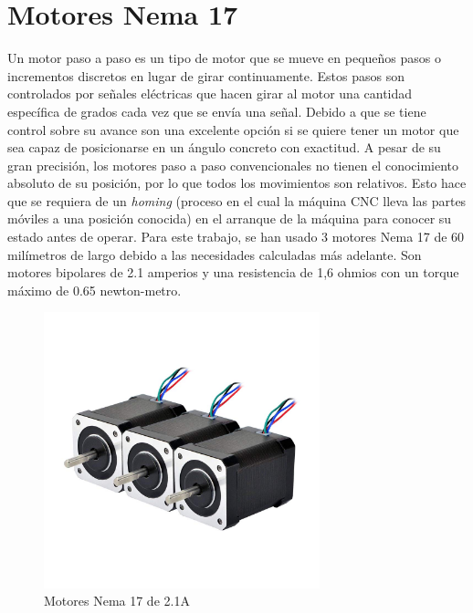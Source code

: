 \section{Motores Nema 17}
\label{subsec:motores}
Un motor paso a paso es un tipo de motor que se mueve en pequeños pasos o incrementos discretos en lugar de girar continuamente. Estos pasos 
son controlados por señales eléctricas que hacen girar al motor una cantidad específica de grados cada vez que se envía una señal. Debido a que se tiene 
control sobre su avance son una excelente opción si se quiere tener un motor que sea capaz de posicionarse en un ángulo concreto con exactitud. A pesar
de su gran precisión, los motores paso a paso convencionales no tienen el conocimiento absoluto de su posición, por lo que todos los movimientos son 
relativos. Esto hace que se requiera de un \textit{homing} (proceso en el cual la máquina CNC lleva las partes móviles a una 
posición conocida) en el arranque de la máquina para conocer su estado antes de operar.
Para este trabajo, se han usado 3 motores Nema 17 de 60 milímetros de largo debido a las necesidades calculadas más adelante. Son motores bipolares de 
2.1 amperios y una resistencia de 1,6 ohmios con un torque máximo de 0.65 newton-metro.
\begin{figure} [h!]
    \begin{center}
      \includegraphics[width=8cm]{figs/nema17.jpg}
    \end{center}
    \caption{Motores Nema 17 de 2.1A}
    \label{fig:robSoldering}
  \end{figure}\ 

